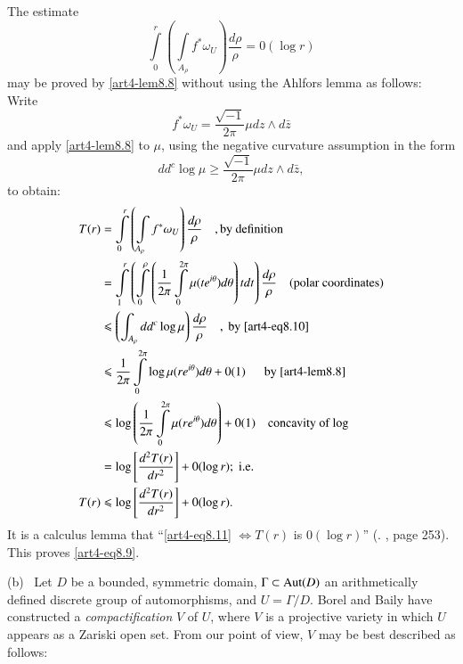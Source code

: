\begin{remark*}
The estimate
\begin{equation}
\int\limits^r_0 \left(\int\limits_{A_\rho} f^\ast \omega_U \right) \frac{d \rho}{\rho} = 0 (\log r)
\label{art4-eq8.9}
\end{equation}
may be proved by \eqref{art4-lem8.8} without using the Ahlfors lemma as follows: Write
$$
f^\ast \omega_U = \frac{\sqrt{-1}}{2\pi} \mu d z \wedge d \bar{z}
$$
and apply \eqref{art4-lem8.8} to $\mu$, using the negative curvature assumption in the form 
\begin{equation}
dd^c \log \mu \geqslant \frac{\sqrt{-1}}{2\pi} \mu dz \wedge d \bar{z}, \label{art4-eq8.10}
\end{equation}
to obtain:
\begin{align}
T(r) & = \int\limits^r_0 \left(\int\limits_{A_\rho} f^{\ast} \omega_U \right) \frac{d \rho}{\rho} \quad, \text{by definition} \notag\\
& = \int\limits^r_1 \left(\int\limits^\rho_0 \left(\frac{1}{2\pi} \int\limits^{2\pi}_0 \mu (te^{i\theta}) d \theta \right) t d t \right) \frac{d\rho}{\rho} \quad \text{(polar coordinates)} \notag\\
& \leqslant \left(\int_{A_\rho} dd^c \log \mu \right) \frac{d \rho}{ \rho} \quad, \text{ by \eqref{art4-eq8.10}}\notag\\
& \leqslant \frac{1}{2\pi} \int\limits^{2\pi}_0 \log \mu (re^{i\theta}) d \theta + 0 (1) \quad \text{~ by \eqref{art4-lem8.8}} \notag\\
& \leqslant \log \left(\frac{1}{2\pi} \int\limits^{2\pi}_0  \mu (re^{i\theta}) d\theta \right) + 0 (1) \quad  \text{concavity of log} \notag\\
& = \log \left[\frac{d^2 T (r)}{dr^2}\right] + 0 (\log r); \; \text{{i.e.}\kern.3em}\notag\\
T(r) & \leqslant \log \left[\frac{d^2 T (r)}{dr^2} \right] + 0 (\log r). \label{art4-eq8.11}
\end{align}\pageoriginale
It is a calculus lemma that ``\eqref{art4-eq8.11} $\Leftrightarrow T (r)$ is $0 (\log r)$'' (\cf. \cite{art4-key38}, page 253). This proves \eqref{art4-eq8.9}.
\end{remark*}

\noindent
(b)~  Let $D$ be a bounded, symmetric domain, $\Gamma \subset \operatorname{Aut} (D)$  an arithmetically defined discrete group of automorphisms, and $U =\Gamma / D$. Borel and Baily \cite{art4-key2} have constructed a \textit{compactification} $V$ of $U$, where $V$ is a projective variety in which $U$ appears as a Zariski open set. From our point of view, $V$ may be best described as follows:


